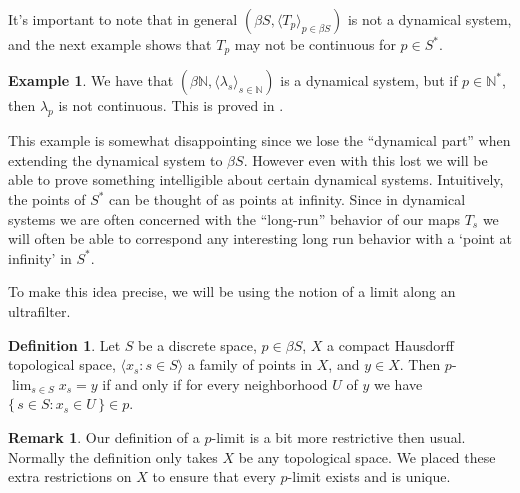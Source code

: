 \documentclass[12pt]{article}
\theoremstyle{plain}
\theoremstyle{definition}
\newtheorem{defn}[thm]{Definition}
\newtheorem{example}[thm]{Example}
\newtheorem{rmk}[thm]{Remark}
\newcommand{\la}{\langle}
\newcommand{\ra}{\rangle}
\newcommand{\bbN}{\mathbb{N}}
\begin{document}
It's important to note that in general $(\beta S, \la T_p \ra_{p
  \in \beta S})$ is not a dynamical system, and 
the next example shows that $T_p$ may not be continuous for $p \in S^*$.
 

  \begin{example}
    We have that $(\beta\bbN, \la \lambda_s \ra_{s\in\bbN})$ is a
    dynamical system, but if $p \in \bbN^*$, then $\lambda_p$ is not
    continuous.
    This is proved in \cite[Theorem 6.10 and Remark 6.11]{Hindman:1998fk}.
   \end{example}

This example is somewhat disappointing since we lose the ``dynamical
part'' when extending the dynamical system to $\beta S$.
However even with this lost we will be able to prove something
intelligible about certain dynamical systems. 
Intuitively, the points of $S^*$ can be thought of as points at
infinity. 
Since in dynamical systems we are often concerned with the
``long-run'' behavior of our maps $T_s$ we will often be able to
correspond any interesting long run behavior with a `point at infinity'
in $S^*$.

To make this idea precise, we will be using the notion of a limit
along an ultrafilter. 

  \begin{defn}
    \label{defn:plim}
    Let $S$ be a discrete space, $p \in \beta S$, $X$ a compact
    Hausdorff topological space, $\la x_s : s \in S \ra$ a family
    of points in $X$, and $y \in X$.
    Then \hbox{$p$-$\displaystyle\lim_{s \in S} x_s = y$} if and only
    if for every
    neighborhood $U$ of $y$ we have $\{\, s \in S : x_s \in U \,\} \in p$.
  \end{defn}

  \begin{rmk}
    Our definition of a \hbox{$p$-limit} is a bit more restrictive
    then usual.
    Normally the definition only takes $X$ be any topological space.
    We placed these extra restrictions on $X$ to ensure that every
    \hbox{$p$-limit} exists and is unique.
  \end{rmk}
\end{document}
